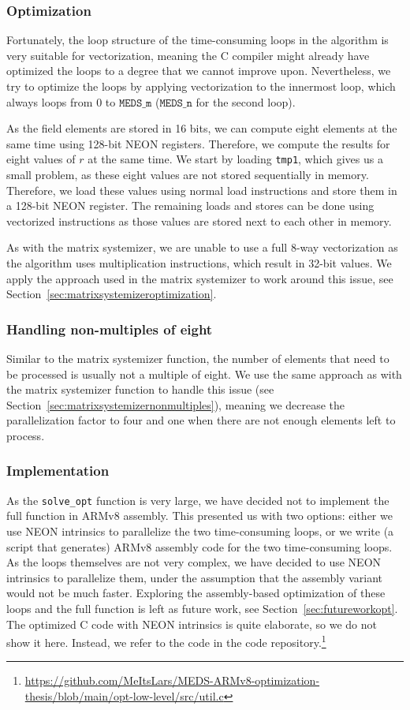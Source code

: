 \documentclass[11pt,a4paper]{report}
\theoremstyle{definition}
\begin{document}
\subsubsection{Optimization}
\label{sec:isometryderivationoptimization}
Fortunately, the loop structure of the time-consuming loops in the algorithm is very suitable for vectorization, meaning the C compiler might already have optimized the loops to a degree that we cannot improve upon.  Nevertheless, we try to optimize the loops by applying vectorization to the innermost loop, which always loops from $0$ to $\texttt{MEDS\_m}$ ($\texttt{MEDS\_n}$ for the second loop).

As the field elements are stored in 16 bits, we can compute eight elements at the same time using 128-bit NEON registers. Therefore, we compute the results for eight values of $r$ at the same time. We start by loading \texttt{tmp1}, which gives us a small problem, as these eight values are not stored sequentially in memory. Therefore, we load these values using normal load instructions and store them in a 128-bit NEON register. The remaining loads and stores can be done using vectorized instructions as those values are stored next to each other in memory.

As with the matrix systemizer, we are unable to use a full 8-way vectorization as the algorithm uses multiplication instructions, which result in 32-bit values. We apply the approach used in the matrix systemizer to work around this issue, see Section~\ref{sec:matrixsystemizeroptimization}.

\subsubsection{Handling non-multiples of eight}
Similar to the matrix systemizer function, the number of elements that need to be processed is usually not a multiple of eight. We use the same approach as with the matrix systemizer function to handle this issue (see Section~\ref{sec:matrixsystemizernonmultiples}), meaning we decrease the parallelization factor to four and one when there are not enough elements left to process.

\subsubsection{Implementation}
As the \texttt{solve\_opt} function is very large, we have decided not to implement the full function in ARMv8 assembly. This presented us with two options: either we use NEON intrinsics to parallelize the two time-consuming loops, or we write (a script that generates) ARMv8 assembly code for the two time-consuming loops. As the loops themselves are not very complex, we have decided to use NEON intrinsics to parallelize them, under the assumption that the assembly variant would not be much faster. Exploring the assembly-based optimization of these loops and the full function is left as future work, see Section~\ref{sec:futureworkopt}. The optimized C code with NEON intrinsics is quite elaborate, so we do not show it here. Instead, we refer to the code in the code repository.\footnote{\url{https://github.com/MeItsLars/MEDS-ARMv8-optimization-thesis/blob/main/opt-low-level/src/util.c}}
\end{document}
